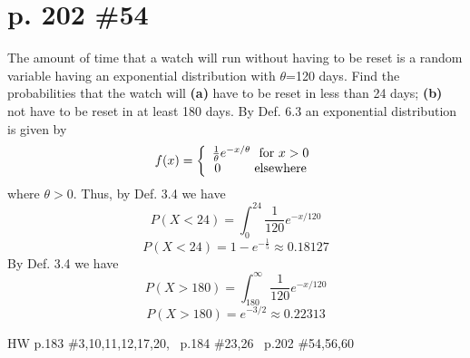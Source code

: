 \documentclass[12pt]{article}
\begin{document}
	\section[20pt]{p. 202 \#54}
	The amount of time that a watch will run without having to be reset is a random variable having an exponential distribution with \(\theta\)=120 days. Find the probabilities that the watch will \newline
	\textbf{(a)} have to be reset in less than 24 days;
	\newline
	\textbf{(b)} not have to be reset in at least 180 days.
	By Def. 6.3 an exponential distribution is given by
	\[f(x)=\left\{\begin{array}{ccc}
	\frac{1}{\theta}e^{-x/\theta}\ \textup{ for } x>0\\ 0 \ \ \ \ \ \ \ \ \textup{elsewhere}
	\end{array}\right.\]
	where \(\theta>0.\)
	\newline \newline
	Thus, by Def. 3.4 we have
	\[P(X<24)=\int_0^{24}\frac{1}{120}e^{-x/120}\]
	\[P(X<24)=1-e^{-\frac{1}{5}} \approx 0.18127\]
	\newline \newline
	By Def. 3.4 we have
	\[P(X>180)=\int_{180}^{\infty}\frac{1}{120}e^{-x/120}\]
	\[P(X>180)=e^{-3/2}\approx 0.22313\]
	\newpage
	\maketitle HW p.183 \#3,10,11,12,17,20, \ p.184 \#23,26 \ p.202 \#54,56,60
\end{document}

